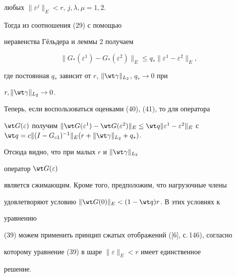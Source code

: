 любых $\|\varepsilon^j\|_E<r$, $j,\lambda,\mu=1,2$. 


Тогда из соотношения (29) с помощью 


неравенства Г\"ельдера и леммы 2 получаем 


\begin{equation} 


\|G_*(\varepsilon^1)-G_*(\varepsilon^2)\|_E\le 


q_*\|\varepsilon^1-\varepsilon^2\|_E, 


\end{equation} 


где постоянная $q_*$ зависит от $r$, $\|\wt\gamma\|_{L_2}$, $q_*\to0$ при 


$r,\|\wt\gamma\|_{L_2}\to0$. 


Теперь, если воспользоваться оценками (40), (41), то для оператора 


$\wt G(\varepsilon)$ получим $\|\wt G(\varepsilon^1)-\wt 


G(\varepsilon^2)\|_E\le \wt q\|\varepsilon^1- \varepsilon^2\|_E$ с $\wt 


q=c\|(I-G_{c1})^{-1}\|_E(r+\|\wt\gamma\|_{L_2}+q_*)$. 


Отсюда видно, что при малых $r$ и $\|\wt\gamma\|_{L_2}$ 


оператор $\wt G(\varepsilon)$ 


является сжимающим. Кроме того, предположим, что нагрузочные члены 


удовлетворяют условию $\|\wt G(0)\|_E<(1-\wt q)r$. В этих условиях к 


уравнению 


(39) можем применить принцип сжатых отображений ([6], с.\,146), согласно 


которому уравнение (39) в шаре $\|\varepsilon\|_E<r$ имеет единственное 


решение. 


 


 


